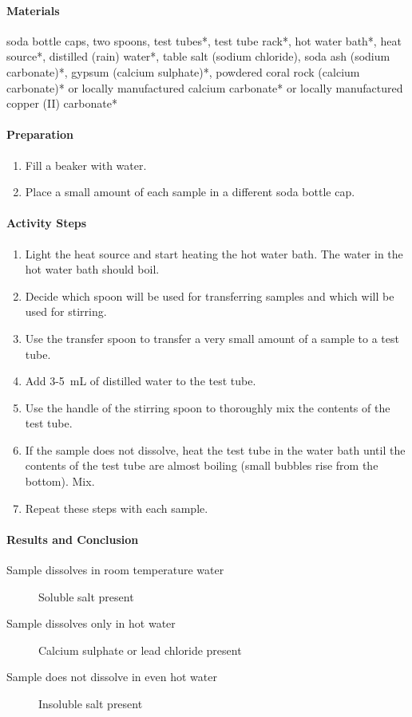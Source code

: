 \paragraph{Materials}
soda bottle caps, two spoons, test tubes*, test tube rack*, hot water bath*, heat source*, distilled (rain) water*, table salt (sodium chloride), soda ash (sodium carbonate)*, gypsum (calcium sulphate)*, powdered coral rock (calcium carbonate)* or locally manufactured calcium carbonate* or locally manufactured copper (II) carbonate*

\paragraph{Preparation}
\begin{enumerate}
\item{Fill a beaker with water.}
\item{Place a small amount of each sample in a different soda bottle cap.}
\end{enumerate}

\paragraph{Activity Steps}
\begin{enumerate}
\item{Light the heat source and start heating the hot water bath. The water in the hot water bath should boil.}
\item{Decide which spoon will be used for transferring samples and which will be used for stirring.}
\item{Use the transfer spoon to transfer a very small amount of a sample to a test tube.}
\item{Add 3-5~mL of distilled water to the test tube.}
\item{Use the handle of the stirring spoon to thoroughly mix the contents of the test tube.}
\item{If the sample does not dissolve, heat the test tube in the water bath until the contents of the test tube are almost boiling (small bubbles rise from the bottom). Mix.}
\item{Repeat these steps with each sample.}

\end{enumerate}

\paragraph{Results and Conclusion}
\begin{description}
\item[Sample dissolves in room temperature water]{Soluble salt present}
\item[Sample dissolves only in hot water]{Calcium sulphate or lead chloride present}
\item[Sample does not dissolve in even hot water]{Insoluble salt present}
\end{description}

